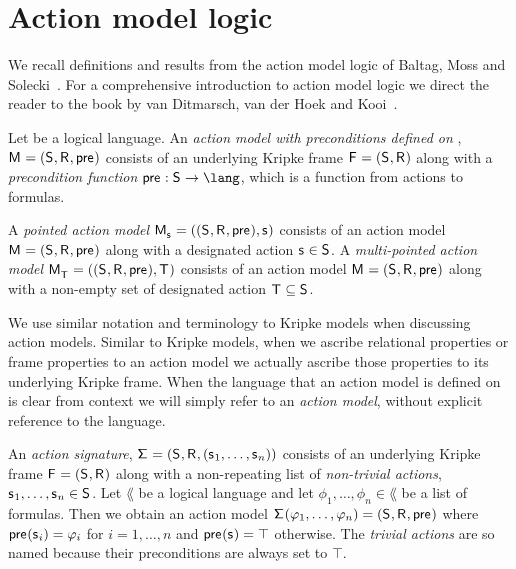 \section{Action model logic}\label{aml}

We recall definitions and results from the action model logic of Baltag, Moss and Solecki~\cite{baltag:1998,baltag:2004}.
For a comprehensive introduction to action model logic we direct the reader to the book by van Ditmarsch, van der Hoek and Kooi~\cite{vanditmarsch:2007}.

\begin{definition}
Let \lang{} be a logical language.
An {\em action model with preconditions defined on \lang{}}, $\aModelAndTuple$ consists of an underlying Kripke frame $\aFrameAndTuple$ along with a {\em precondition function} $\aPrecondition : \aStates \to \lang$, which is a function from actions to formulas.

A {\em pointed action model} $\aPModelAndTuple{\aStateS}$ consists of an action model $\aModelAndTuple$ along with a designated action $\aStateS \in \aStates$.
A {\em multi-pointed action model} $\aPModelAndTuple{\aStatesT}$ consists of an action model $\aModelAndTuple$ along with a non-empty set of designated action $\aStatesT \subseteq \aStates$.
\end{definition}

We use similar notation and terminology to Kripke models when discussing action models.
Similar to Kripke models, when we ascribe relational properties or frame properties to an action model we actually ascribe those properties to its underlying Kripke frame.
When the language that an action model is defined on is clear from context we will simply refer to an {\em action model}, without explicit reference to the language.

\begin{definition}
An {\em action signature}, $\aSignatureAndTuple$ consists of an underlying Kripke frame $\aFrameAndTuple$ along with a non-repeating list of {\em non-trivial actions}, $\aStateS_1, \dots, \aStateS_n \in \aStates$.
Let $\lang$ be a logical language and let $\phi_1, \dots, \phi_n \in \lang$ be a list of formulas.
Then we obtain an action model $\aSignature(\phi_1, \dots, \phi_n) = \aModelTuple$ where $\aPrecondition(\aStateS_i) = \phi_i$ for $i = 1, \dots, n$ and $\aPrecondition(\aStateS) = \top$ otherwise.
The {\em trivial actions} are so named because their preconditions are always set to $\top$.
\end{definition}


